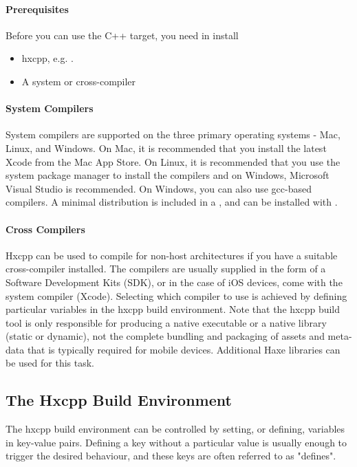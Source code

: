 \paragraph{Prerequisites}
Before you can use the C++ target, you need in install
\begin{itemize}
	\item hxcpp, e.g. .
	\item A system or cross-compiler
\end{itemize}

\paragraph{System Compilers}
System compilers are supported on the three primary operating systems - Mac, Linux, and Windows.  On Mac, it is recommended that you install the latest Xcode from the Mac App Store.  On Linux, it is recommended that you use the system package manager to install the compilers and on Windows, Microsoft Visual Studio is recommended.  On Windows, you can also use gcc-based compilers.  A minimal distribution is included in a , and can be installed with .

\paragraph{Cross Compilers}
Hxcpp can be used to compile for non-host architectures if you have a suitable cross-compiler installed.  The compilers are usually supplied in the form of a Software Development Kits (SDK), or in the case of iOS devices, come with the system compiler (Xcode).  Selecting which compiler to use is achieved by defining particular variables in the hxcpp build environment.  Note that the hxcpp build tool is only responsible for producing a native executable or a native library (static or dynamic), not the complete bundling and packaging of assets and meta-data that is typically required for mobile devices.  Additional Haxe libraries can be used for this task.

\subsection{The Hxcpp Build Environment}
\label{target-cpp-build-environment}
The hxcpp build environment can be controlled by setting, or defining, variables in key-value pairs. Defining a key without a particular value is usually enough to trigger the desired behaviour, and these keys are often referred to as "defines".

